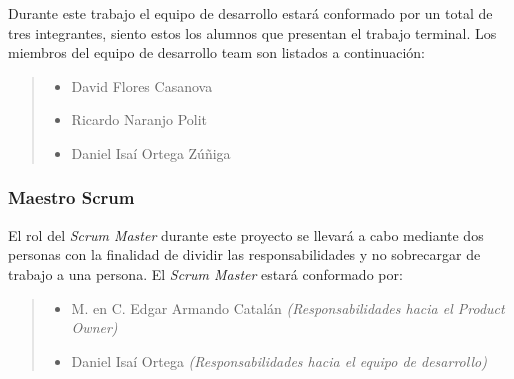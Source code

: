  Durante este trabajo el equipo de desarrollo estará conformado por un total de
 tres integrantes, siento estos los alumnos que presentan el trabajo terminal. Los miembros del
 equipo de desarrollo team son listados a continuación:

    \begin{quote}
    \begin{itemize}
        \item David Flores Casanova
        \item Ricardo Naranjo Polit
        \item Daniel Isaí Ortega Zúñiga
    \end{itemize}
    \end{quote}






\subsubsection{Maestro Scrum}

 El rol del {\it Scrum Master} durante este proyecto se llevará a cabo mediante
 dos personas con la finalidad de dividir las responsabilidades y no sobrecargar de trabajo
 a una persona. El {\it Scrum Master} estará conformado por:

    \begin{quote}
    \begin{itemize}
        \item M. en C. Edgar Armando Catalán {\it (Responsabilidades hacia el Product Owner)}
        \item Daniel Isaí Ortega {\it(Responsabilidades hacia el equipo de desarrollo)}
    \end{itemize}                        
    \end{quote}


